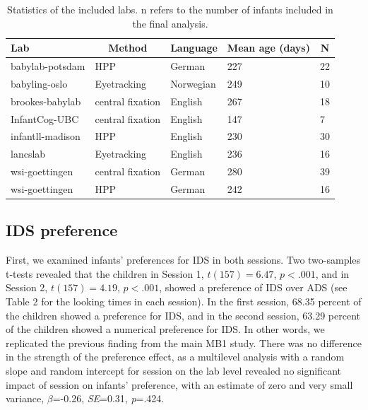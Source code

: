 \documentclass[
  man,floatsintext]{apa6}
\begin{document}
\begin{table}[tbp]

\begin{center}
\begin{threeparttable}

\caption{\label{tab:labs}Statistics of the included labs. n refers to the number of infants included in the final analysis.}

\begin{tabular}{lllll}
\toprule
Lab & \multicolumn{1}{c}{Method} & \multicolumn{1}{c}{Language} & \multicolumn{1}{c}{Mean age (days)} & \multicolumn{1}{c}{N}\\
\midrule
babylab-potsdam & HPP & German & 227 & 22\\
babyling-oslo & Eyetracking & Norwegian & 249 & 10\\
brookes-babylab & central fixation & English & 267 & 18\\
InfantCog-UBC & central fixation & English & 147 & 7\\
infantll-madison & HPP & English & 230 & 30\\
lancslab & Eyetracking & English & 236 & 16\\
wsi-goettingen & central fixation & German & 280 & 39\\
wsi-goettingen & HPP & German & 242 & 16\\
\bottomrule
\end{tabular}

\end{threeparttable}
\end{center}

\end{table}

\hypertarget{ids-preference}{%
\subsection{IDS preference}\label{ids-preference}}

First, we examined infants' preferences for IDS in both sessions. Two two-samples t-tests revealed that the children in Session 1, \(t(157) = 6.47\), \(p < .001\), and in Session 2, \(t(157) = 4.19\), \(p < .001\), showed a preference of IDS over ADS (see Table 2 for the looking times in each session). In the first session, 68.35 percent of the children showed a preference for IDS, and in the second session, 63.29 percent of the children showed a numerical preference for IDS. In other words, we replicated the previous finding from the main MB1 study. There was no difference in the strength of the preference effect, as a multilevel analysis with a random slope and random intercept for session on the lab level revealed no significant impact of session on infants' preference, with an estimate of zero and very small variance, \(\beta\)=-0.26, \emph{SE}=0.31, \emph{p}=.424.
\end{document}
